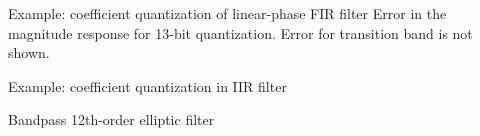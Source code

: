 \documentclass[10pt, handout]{beamer}
\begin{document}
\begin{frame}{Example: coefficient quantization of linear-phase FIR filter}
	Error in the magnitude response for 13-bit quantization. Error for transition band is not shown.
\begin{center}
\end{center}
\end{frame}

%
\begin{frame}{Example: coefficient quantization in IIR filter}

Bandpass 12th-order elliptic filter
\begin{columns}
\begin{column}{0.5\textwidth}
	\begin{center}
		\resizebox{\textwidth}{!}{}
	\end{center}
\end{column}

\begin{column}{0.6\textwidth}
	\begin{center}
		\resizebox{\textwidth}{!}{}
	\end{center}
\end{column}
\end{columns}
\end{frame}
\end{document}

